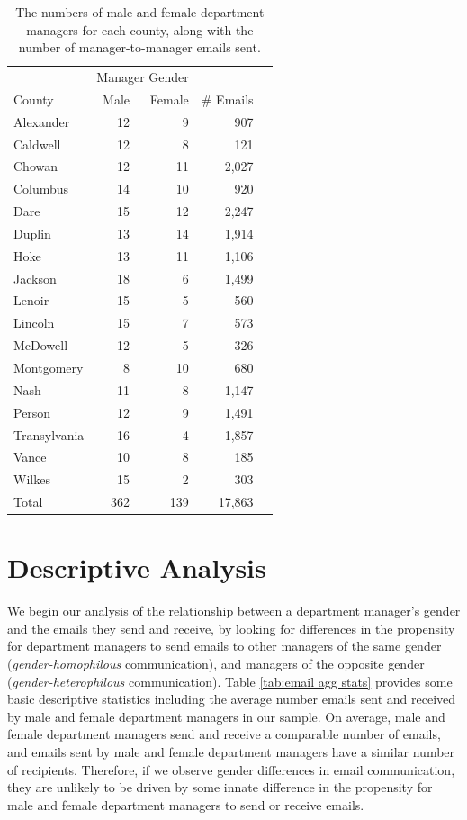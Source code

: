 \documentclass{pnastwo}
\begin{document}
\begin{article}
\begin{table}
  \centering
  \begin{tabular}{lrrrr}
    \toprule
    & \multicolumn{2}{c}{Manager Gender} & \\
    \cmidrule{2-3}
    County & Male & Female & \# Emails  \\
    \midrule
    Alexander & 12 & 9 & 907   \\
    Caldwell & 12 & 8 & 121     \\
    Chowan & 12 & 11 & 2,027   \\
    Columbus & 14 & 10 & 920   \\
    Dare & 15 & 12 & 2,247    \\
    Duplin & 13 & 14 & 1,914    \\
    Hoke & 13 & 11 & 1,106  \\
    Jackson & 18 & 6 & 1,499    \\
    Lenoir & 15 & 5 & 560  \\
    Lincoln & 15 & 7 & 573   \\
    McDowell & 12 & 5 & 326   \\
    Montgomery & 8 & 10 & 680   \\
    Nash & 11 & 8 & 1,147  \\
    Person & 12 & 9 & 1,491   \\
    Transylvania & 16 & 4 & 1,857  \\
    Vance & 10 & 8 & 185   \\
    Wilkes & 15 & 2 & 303   \\
    \midrule
    Total & 362 & 139 & 17,863 \\
    \bottomrule
  \end{tabular}
  \caption{\label{tab:county aggregate stats} The numbers of male and
    female department managers for each county, along with the number
    of manager-to-manager emails sent.}
\end{table}



\section{Descriptive Analysis}

We begin our analysis of the relationship between a department manager's gender and the emails they send and receive, by looking for differences in the propensity for department managers to send emails to other managers of the same gender (\emph{gender-homophilous} communication), and managers of the opposite gender (\emph{gender-heterophilous} communication). Table \ref{tab:email agg stats} provides some basic descriptive statistics including the average number emails sent and received by male and female department managers in our sample. On average, male and female department managers send and receive a comparable number of emails, and emails sent by male and female department managers have a similar number of recipients. Therefore, if we observe gender differences in email communication, they are unlikely to be driven by some innate difference in the propensity for male and female department managers to send or receive emails. 
	

\end{article}
\end{document}
